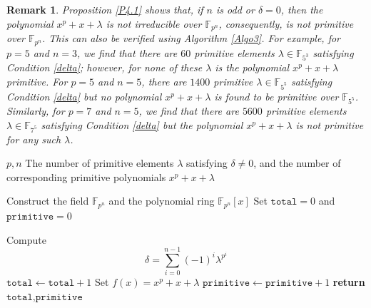 \documentclass[preprint,12pt]{elsarticle}
\newtheorem{rk}{Remark}[section]
\begin{document}
        \begin{rk}\label{R4.1}
        {\upshape Proposition \ref{P4.1}} shows that, if $n$ is odd or $\delta=0$, then the polynomial $x^p+x+\lambda$ is not irreducible over $\mathbb{F}_{p^n}$, consequently, is not primitive over $\mathbb{F}_{p^n}$. This can also be verified using {\upshape Algorithm \ref{Algo3}}. For example, for $p=5$ and $n=3$, we find that there are $60$ primitive elements $\lambda\in\mathbb{F}_{5^3}$ satisfying {\upshape Condition \eqref{delta}}; however, for none of these $\lambda$ is the polynomial $x^p+x+\lambda$ primitive. For $p=5$ and $n=5$, there are $1400$ primitive $\lambda\in\mathbb{F}_{5^5}$ satisfying {\upshape Condition \eqref{delta}} but no polynomial $x^p+x+\lambda$ is found to be primitive over $\mathbb{F}_{5^5}$. Similarly, for $p=7$ and $n=5$, we find that there are $5600$ primitive elements $\lambda\in\mathbb{F}_{7^5}$ satisfying {\upshape Condition \eqref{delta}} but the polynomial $x^p+x+\lambda$ is not primitive for any such $\lambda$. 
     \end{rk}   

     \begin{algorithm}[h!]
    \caption{{Testing Primitivity of $x^p+x+\lambda$} \label{Algo3}}
    \begin{algorithmic}[1]
        \Require $p,n$
        \Ensure The number of primitive elements $\lambda$ satisfying $\delta\neq0$, and the number of corresponding primitive polynomials $x^p+x+\lambda$

        
        \State Construct the field $\mathbb{F}_{p^n}$ and the polynomial ring $\mathbb{F}_{p^n}[x]$
        \State Set $\texttt{total}=0$ and $\texttt{primitive}=0$

                \State Compute
                $$
                \delta=\sum_{i=0}^{n-1}(-1)^i \lambda^{p^i}
                $$
                    \State $\texttt{total}\gets\texttt{total}+1$
                    \State Set $f(x)=x^p+x+\lambda$
                        \State $\texttt{primitive}\gets\texttt{primitive}+1$
                    \EndIf
                \EndIf
            \EndIf
        \EndFor
        \State \textbf{return} $\texttt{total},\texttt{primitive}$
    \end{algorithmic}
\end{algorithm}
\end{document}
